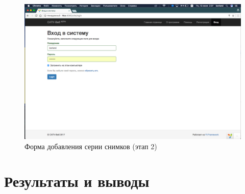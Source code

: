 	\begin{figure}[t!]
		\centering
		\includegraphics[width=1\textwidth]{images/scrshots/login_1}
		\caption{Форма добавления серии снимков (этап 2)}
		\label{scrshot:login_1}
	\end{figure}


\section{Результаты и выводы}

